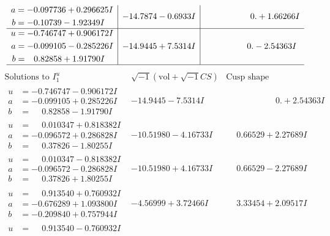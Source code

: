 \documentclass[1p]{elsarticle_modified}
\theoremstyle{definition}
\newcommand{\I}{\sqrt{-1}}
\begin{document}
$$\begin{array}{c|c|c}
\begin{aligned}
a &= -0.097736 + 0.296625 I \\
b &= -0.10739 - 1.92349 I\end{aligned}
 & -14.7874 - 0.6933 I & \phantom{-0.000000 -}0. + 1.66266 I \\ \hline\begin{aligned}
u &= -0.746747 + 0.906172 I \\
a &= -0.099105 - 0.285226 I \\
b &= \phantom{-}0.82858 + 1.91790 I\end{aligned}
 & -14.9445 + 7.5314 I & \phantom{-0.000000 } 0. - 2.54363 I\\
 \hline 
 \end{array}$$\newpage$$\begin{array}{c|c|c}  
\text{Solutions to }I^u_{1}& \I (\text{vol} + \sqrt{-1}CS) & \text{Cusp shape}\\
 \hline 
\begin{aligned}
u &= -0.746747 - 0.906172 I \\
a &= -0.099105 + 0.285226 I \\
b &= \phantom{-}0.82858 - 1.91790 I\end{aligned}
 & -14.9445 - 7.5314 I & \phantom{-0.000000 -}0. + 2.54363 I \\ \hline\begin{aligned}
u &= \phantom{-}0.010347 + 0.818382 I \\
a &= -0.096572 + 0.286828 I \\
b &= \phantom{-}0.37826 - 1.80255 I\end{aligned}
 & -10.51980 - 4.16733 I & \phantom{-}0.66529 + 2.27689 I \\ \hline\begin{aligned}
u &= \phantom{-}0.010347 - 0.818382 I \\
a &= -0.096572 - 0.286828 I \\
b &= \phantom{-}0.37826 + 1.80255 I\end{aligned}
 & -10.51980 + 4.16733 I & \phantom{-}0.66529 - 2.27689 I \\ \hline\begin{aligned}
u &= \phantom{-}0.913540 + 0.760932 I \\
a &= -0.676289 + 1.093800 I \\
b &= -0.209840 + 0.757944 I\end{aligned}
 & -4.56999 + 3.72466 I & \phantom{-}3.33454 + 2.09517 I \\ \hline\begin{aligned}
u &= \phantom{-}0.913540 - 0.760932 I \\

\end{aligned}
\end{array}$$
\end{document}
